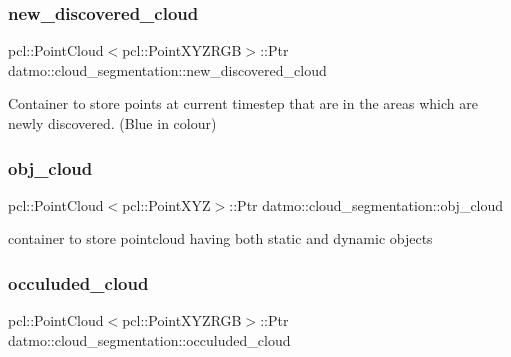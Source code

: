 \subsubsection{\texorpdfstring{new\+\_\+discovered\+\_\+cloud}{new\_discovered\_cloud}}
{\footnotesize\ttfamily pcl\+::\+Point\+Cloud$<$pcl\+::\+Point\+X\+Y\+Z\+R\+GB$>$\+::Ptr datmo\+::cloud\+\_\+segmentation\+::new\+\_\+discovered\+\_\+cloud\hspace{0.3cm}{\ttfamily [protected]}}



Container to store points at current timestep that are in the areas which are newly discovered. (Blue in colour) 

\mbox{\label{classdatmo_1_1cloud__segmentation_ad946a48ab59bf9f48338f9ef0702181c}} 
\subsubsection{\texorpdfstring{obj\+\_\+cloud}{obj\_cloud}}
{\footnotesize\ttfamily pcl\+::\+Point\+Cloud$<$pcl\+::\+Point\+X\+YZ$>$\+::Ptr datmo\+::cloud\+\_\+segmentation\+::obj\+\_\+cloud\hspace{0.3cm}{\ttfamily [protected]}}



container to store pointcloud having both static and dynamic objects 

\mbox{\label{classdatmo_1_1cloud__segmentation_a2f85f1a51b2e90dbce996d90cb3e0155}} 
\subsubsection{\texorpdfstring{occuluded\+\_\+cloud}{occuluded\_cloud}}
{\footnotesize\ttfamily pcl\+::\+Point\+Cloud$<$pcl\+::\+Point\+X\+Y\+Z\+R\+GB$>$\+::Ptr datmo\+::cloud\+\_\+segmentation\+::occuluded\+\_\+cloud\hspace{0.3cm}{\ttfamily [protected]}}




